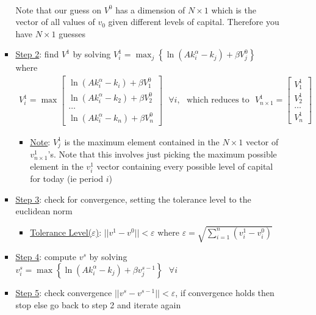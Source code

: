 \documentclass{article}
\begin{document}
\begin{itemize}
\begin{itemize}
\begin{itemize}
\begin{gather*}
            \end{gather*}
            Note that our guess on $V^{0}$ has a dimension of $N \times 1$ which is the vector of all values of $v_{0}$ given different levels of capital. Therefore you have $N \times 1$ guesses
            \item \underline{Step 2}: find $V^{1}$ by solving $V_{i}^{1}=\max_{j} \left\{ \ln(Ak_{i}^{\alpha} - k_{j}) + \beta V_{j}^{0} \right\}$ where
            \begin{gather*}
                V_{i}^{1} = \max \begin{bmatrix} \ln(Ak_{i}^{\alpha} - k_{i}) + \beta V_{1}^{0} \\ \ln(Ak_{i}^{\alpha} - k_{2}) + \beta V_{2}^{0} \\ \dots \\ \ln(Ak_{i}^{\alpha} - k_{n}) + \beta V_{n}^{0} \end{bmatrix} \ \ \ \forall i, \ \ \ \text{which reduces to} \ \ \ V_{n \times 1}^{1} = \begin{bmatrix} V_{1}^{1} \\ V_{2}^{1} \\ \dots \\ V_{n}^{1} \end{bmatrix}
            \end{gather*}
            \begin{itemize}
                \item \underline{Note}: $V_{j}^{1}$ is the maximum element contained in the  $N \times 1$ vector of $v_{n \times 1}^{1}$'s. Note that this involves just picking the maximum possible element in the $v_{i}^{1}$ vector containing every possible level of capital for today (ie period $i$)
            \end{itemize}
            \item \underline{Step 3}: check for convergence, setting the tolerance level to the euclidean norm
            \begin{itemize}
                \item \underline{Tolerance Level($\varepsilon$)}: $||v^{1} - v^{0}||< \varepsilon$ where $\varepsilon = \sqrt{\sum_{i=1}^{n}(v_{i}^{1}-v_{i}^{0})}$
            \end{itemize}
            \item  \underline{Step 4}: compute $v^{s}$ by solving $v_{i}^{s} = \max \left\{ \ln(Ak_{i}^{\alpha} - k_{j}) + \beta v_{j}^{s-1} \right\} \ \ \ \forall i$
            \item  \underline{Step 5}: check convergence $||v^{s} - v^{s-1}||< \varepsilon$, if convergence holds then stop else go back to step 2 and iterate again
        \end{itemize}
    \end{itemize}
\end{itemize}
\end{document}
